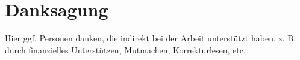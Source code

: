 \section*{Danksagung}
Hier ggf. Personen danken, die indirekt bei der Arbeit unterstützt haben, z. B. durch finanzielles Unterstützen, Mutmachen, Korrekturlesen, etc.
